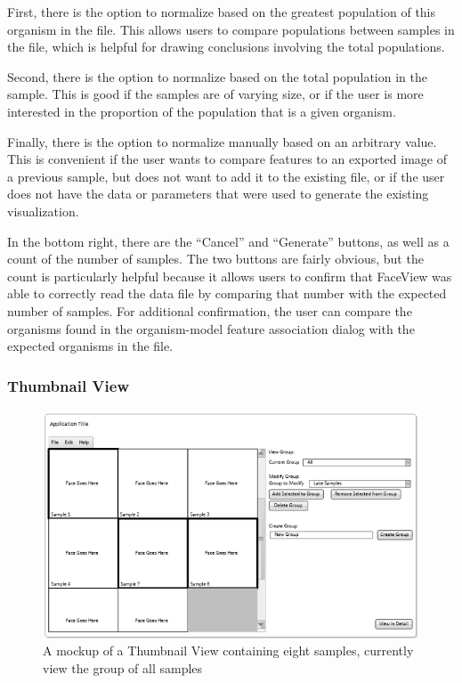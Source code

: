 \documentclass[letterpaper,10pt, onecolumn, draftclsnofoot]{IEEEtran}
\begin{document}
First, there is the option to normalize based on the greatest population of this organism in the file. This allows users to compare populations between samples in the file, which is helpful for drawing conclusions involving the total populations.

Second, there is the option to normalize based on the total population in the sample. This is good if the samples are of varying size, or if the user is more interested in the proportion of the population that is a given organism.

Finally, there is the option to normalize manually based on an arbitrary value. This is convenient if the user wants to compare features to an exported image of a previous sample, but does not want to add it to the existing file, or if the user does not have the data or parameters that were used to generate the existing visualization. 

In the bottom right, there are the ``Cancel'' and ``Generate'' buttons, as well as a count of the number of samples. The two buttons are fairly obvious, but the count is particularly helpful because it allows users to confirm that FaceView was able to correctly read the data file by comparing that number with the expected number of samples. For additional confirmation, the user can compare the organisms found in the organism-model feature association dialog with the expected organisms in the file. 

\subsubsection{Thumbnail View}
\begin{figure}[h]
	\includegraphics[width=\textwidth]{thumbnailMenu.PNG}
	\caption{A mockup of a Thumbnail View containing eight samples, currently view the group of all samples}
	\label{fig:thumbnailMockup}
\end{figure}
\end{document}
